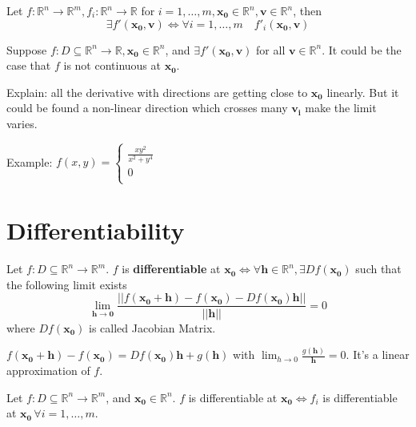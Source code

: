 \begin{proposition}
    Let $f: \mathbb{R}^{n} \to \mathbb{R}^{m}, f_i: \mathbb{R}^{n} \to \mathbb{R}$ for $i=1,\dots,m, \mathbf{x_0} \in \mathbb{R}^{n}, \mathbf{v} \in \mathbb{R}^{n}$, then \[
        \exists f'(\mathbf{x_0}, \mathbf{v}) \iff \forall i = 1,\dots,m \quad f'_i(\mathbf{x_0},\mathbf{v})
    \]
\end{proposition}

\begin{remark*}
    Suppose $f: D \subseteq \mathbb{R}^{n} \to \mathbb{R}, \mathbf{x_0} \in \mathbb{R}^{n}$, and $\exists f'(\mathbf{x_0},\mathbf{v})$ for all $\mathbf{v} \in \mathbb{R}^{n}$. It could be the case that $f$ is not continuous at $\mathbf{x_0}$.

    Explain: all the derivative with directions are getting close to $\mathbf{x_0}$ linearly. But it could be found a non-linear direction which crosses many $\mathbf{v_i}$ make the limit varies.

    Example:
    $f(x,y) = \left\{\begin{array}{l}
            \frac{xy ^{2}}{x ^{2} + y ^{4}} \\
            0                               \\
        \end{array}\right.$
\end{remark*}


\section{Differentiability}

\begin{definition}
    Let $f: D \subseteq \mathbb{R}^{n} \to \mathbb{R}^{m}$. $f$ is \textbf{differentiable} at $\mathbf{x_0} \iff \forall \mathbf{h} \in \mathbb{R}^{n}, \exists Df(\mathbf{x_0})$ such that the following limit exists \[
        \lim_{\mathbf{h} \to \mathbf{0}} \frac{||f(\mathbf{x_0}+\mathbf{h})-f(\mathbf{x_0})-Df(\mathbf{x_0})\mathbf{h}||}{||\mathbf{h}||} = 0
    \]
    where $Df(\mathbf{x_0})$ is called Jacobian Matrix.
    \begin{remark*}
        $f(\mathbf{x_0}+\mathbf{h})-f(\mathbf{x_0}) = Df(\mathbf{x_0})\mathbf{h}+g(\mathbf{h})$ with $\lim_{h \to 0} \frac{g(\mathbf{h})}{\mathbf{h}} = 0$. It's a linear approximation of $f.$
    \end{remark*}
\end{definition}

\begin{proposition}
    Let $f: D \subseteq \mathbb{R}^{n} \to \mathbb{R}^{m}$, and $\mathbf{x_0} \in \mathbb{R}^{n}$.
    $f$ is differentiable at $\mathbf{x_0} \iff f_i$ is differentiable at $\mathbf{x_0}\, \forall i = 1,\dots,m$.
\end{proposition}

